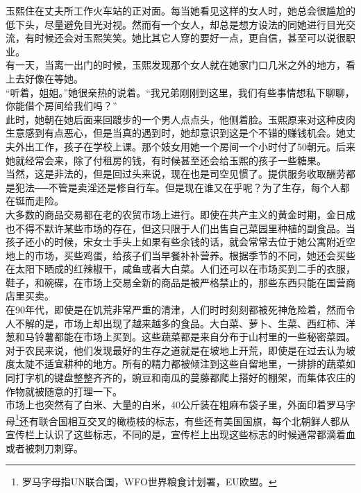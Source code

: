 玉熙住在丈夫所工作火车站的正对面。每当她看见这样的女人时，她总会很尴尬的低下头，尽量避免目光对视。然而有一个女人，却总是想方设法的同她进行目光交流，有时候还会对玉熙笑笑。她比其它人穿的要好一点，更自信，甚至可以说很职业。\\

有一天，当离一出门的时候，玉熙发现那个女人就在她家门口几米之外的地方，看上去好像在等她。\\

“听着，姐姐。”她很亲热的说着。“我兄弟刚刚到这里，我们有些事情想私下聊聊，你能借个房间给我们吗？”\\

此时，她朝在她后面来回踱步的一个男人点点头，他侧着脸。玉熙原来对这种皮肉生意感到有点恶心，但是当真的遇到时，她却意识到这是个不错的赚钱机会。她丈夫外出工作，孩子在学校上课。那个妓女用她一个房间一个小时付了50朝元。后来她就经常会来，除了付租房的钱，有时候甚至还会给玉熙的孩子一些糖果。\\

当然，这是非法的，但是回过头来说，现在也是司空见惯了。提供服务收取酬劳都是犯法──不管是卖淫还是修自行车。但是现在谁又在乎呢？为了生存，每个人都在铤而走险。\\

大多数的商品交易都在老的农贸市场上进行。即使在共产主义的黄金时期，金日成也不得不默许某些市场的存在，但这只限于人们出售自己菜园里种植的副食品。当孩子还小的时候，宋女士手头上如果有些余钱的话，就会常常去位于她公寓附近空地上的市场，买些鸡蛋，给孩子们当早餐补补营养。根据季节的不同，她还会买些在太阳下晒成的红辣椒干，咸鱼或者大白菜。人们还可以在市场买到二手的衣服，鞋子，和碗碟，在市场上交易全新的商品是被严格禁止的，那些东西只能在国营商店里买卖。\\

在90年代，即使是在饥荒非常严重的清津，人们时时刻刻都被死神危险着，然而令人不解的是，市场上却出现了越来越多的食品。大白菜、萝卜、生菜、西红柿、洋葱和马铃薯都能在市场上买到。这些蔬菜都是来自分布于山村里的一些秘密菜园。对于农民来说，他们发现最好的生存之道就是在坡地上开荒，即使是在过去认为坡度太陡不适宜耕种的地方。所有的精力都被倾注到这些自留地里，一排排的蔬菜如同打字机的键盘整整齐齐的，豌豆和南瓜的蔓藤都爬上搭好的棚架，而集体农庄的作物就被随意的打理一下。\\

市场上也突然有了白米、大量的白米，40公斤装在粗麻布袋子里，外面印着罗马字母\footnote{罗马字母指UN联合国，WFO世界粮食计划署，EU欧盟。}还有联合国相互交叉的橄榄枝的标志，有些还有美国国旗，每个北朝鲜人都从宣传栏上认识了这些标志，不同的是，宣传栏上出现这些标志的时候通常都滴着血或者被刺刀刺穿。\\

